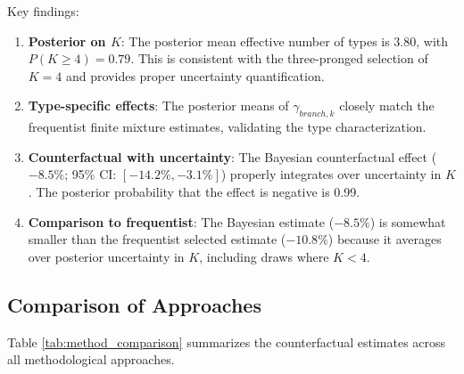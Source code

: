 \documentclass[12pt]{article}
\begin{document}
Key findings:
\begin{enumerate}
    \item \textbf{Posterior on $K$}: The posterior mean effective number of types is 3.80, with $P(K \geq 4) = 0.79$. This is consistent with the three-pronged selection of $K=4$ and provides proper uncertainty quantification.

    \item \textbf{Type-specific effects}: The posterior means of $\gamma_{branch,k}$ closely match the frequentist finite mixture estimates, validating the type characterization.

    \item \textbf{Counterfactual with uncertainty}: The Bayesian counterfactual effect ($-8.5\%$; 95\% CI: $[-14.2\%, -3.1\%]$) properly integrates over uncertainty in $K$. The posterior probability that the effect is negative is 0.99.

    \item \textbf{Comparison to frequentist}: The Bayesian estimate ($-8.5\%$) is somewhat smaller than the frequentist selected estimate ($-10.8\%$) because it averages over posterior uncertainty in $K$, including draws where $K < 4$.
\end{enumerate}

\subsection{Comparison of Approaches}

Table \ref{tab:method_comparison} summarizes the counterfactual estimates across all methodological approaches.
\end{document}
